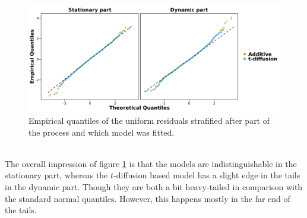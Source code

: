 \begin{figure}[h!]
\begin{center}
    \includegraphics[scale = .1]{figures/OU_vs_t_diffusion_QQ_plot.jpeg}
    \caption{Empirical quantiles of the uniform residuals strafified after part of the process and which model was fitted.}
    \label{figure:OU_t_diffusion_QQ_plot}
\end{center}
\end{figure}\\
The overall impression of figure \ref{figure:OU_t_diffusion_QQ_plot} is that the models are indistinguishable in the stationary part, whereas the $t$-diffusion based model has a slight edge in the tails in the dynamic part. Though they are both a bit heavy-tailed in comparison with the standard normal quantiles. However, this happens mostly in the far end of the tails. 

